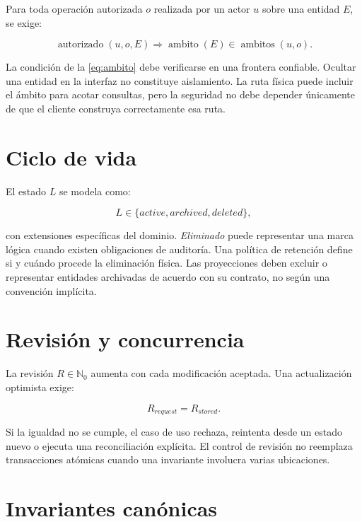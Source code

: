 Para toda operación autorizada $o$ realizada por un actor $u$ sobre una entidad $E$, se
exige:

\begin{equation}
\operatorname{autorizado}(u,o,E)\Rightarrow \operatorname{ambito}(E)\in
\operatorname{ambitos}(u,o).
\label{eq:ambito}
\end{equation}

La condición de la \cref{eq:ambito} debe verificarse en una frontera confiable. Ocultar
una entidad en la interfaz no constituye aislamiento. La ruta física puede incluir el
ámbito para acotar consultas, pero la seguridad no debe depender únicamente de que el
cliente construya correctamente esa ruta.

\section{Ciclo de vida}

El estado $L$ se modela como:

\begin{equation}
L\in\{active,archived,deleted\},
\end{equation}

con extensiones específicas del dominio. \emph{Eliminado} puede representar una marca
lógica cuando existen obligaciones de auditoría. Una política de retención define si y
cuándo procede la eliminación física. Las proyecciones deben excluir o representar
entidades archivadas de acuerdo con su contrato, no según una convención implícita.

\section{Revisión y concurrencia}

La revisión $R\in\mathbb{N}_0$ aumenta con cada modificación aceptada. Una actualización
optimista exige:

\begin{equation}
R_{request}=R_{stored}.
\end{equation}

Si la igualdad no se cumple, el caso de uso rechaza, reintenta desde un estado nuevo o
ejecuta una reconciliación explícita. El control de revisión no reemplaza transacciones
atómicas cuando una invariante involucra varias ubicaciones.

\section{Invariantes canónicas}

